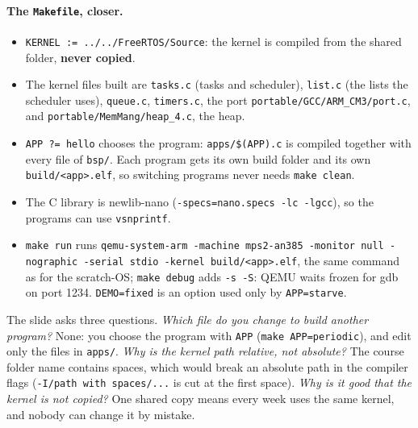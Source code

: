 \paragraph{The \texttt{Makefile}, closer.}
\begin{itemize}
    \item \texttt{KERNEL := ../../FreeRTOS/Source}: the kernel is compiled from the shared folder, \textbf{never copied}.
    \item The kernel files built are \texttt{tasks.c} (tasks and scheduler), \texttt{list.c} (the lists the scheduler uses), \texttt{queue.c}, \texttt{timers.c}, the port \texttt{portable/GCC/ARM\_CM3/port.c}, and \texttt{portable/MemMang/heap\_4.c}, the heap.
    \item \texttt{APP ?= hello} chooses the program: \texttt{apps/\$(APP).c} is compiled together with every file of \texttt{bsp/}. Each program gets its own build folder and its own \texttt{build/<app>.elf}, so switching programs never needs \texttt{make clean}.
    \item The C library is newlib-nano (\texttt{-specs=nano.specs -lc -lgcc}), so the programs can use \texttt{vsnprintf}.
    \item \texttt{make run} runs \texttt{qemu-system-arm -machine mps2-an385 -monitor null -nographic -serial stdio -kernel build/<app>.elf}, the same command as for the scratch-OS; \texttt{make debug} adds \texttt{-s -S}: QEMU waits frozen for gdb on port 1234. \texttt{DEMO=fixed} is an option used only by \texttt{APP=starve}.
\end{itemize}
The slide asks three questions. \emph{Which file do you change to build another program?} None: you choose the program with \texttt{APP} (\texttt{make APP=periodic}), and edit only the files in \texttt{apps/}. \emph{Why is the kernel path relative, not absolute?} The course folder name contains spaces, which would break an absolute path in the compiler flags (\texttt{-I/path with spaces/...} is cut at the first space). \emph{Why is it good that the kernel is not copied?} One shared copy means every week uses the same kernel, and nobody can change it by mistake.

